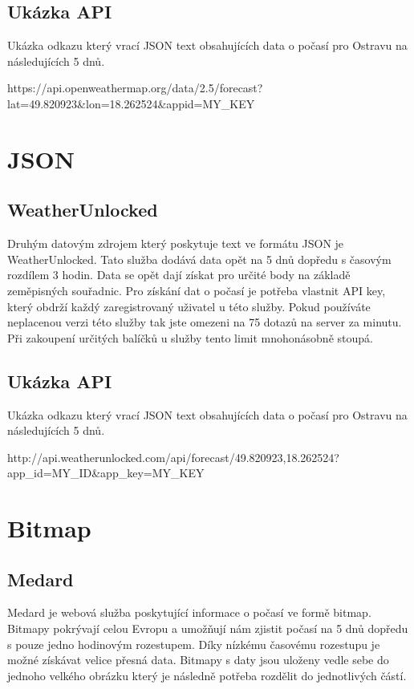\documentclass[czech,bachelor,dept460,male,csharp,cpdeclaration]{diploma}
\begin{document}
	\subsection{Ukázka API}
	
	Ukázka odkazu který vrací JSON text obsahujících data o počasí pro Ostravu na následujících 5 dnů.
	
	https://api.openweathermap.org/data/2.5/forecast?lat=49.820923\&lon=18.262524\&appid=MY\_KEY
	
	\section{JSON}
	\subsection{WeatherUnlocked}
	
	Druhým datovým zdrojem který poskytuje text ve formátu JSON je WeatherUnlocked. Tato služba dodává data opět na 5 dnů dopředu s časovým rozdílem 3 hodin. Data se opět dají získat pro určité body na základě zeměpisných souřadnic. Pro získání dat o počasí je potřeba vlastnit API key, který obdrží každý zaregistrovaný uživatel u této služby. Pokud používáte neplacenou verzi této služby tak jste omezeni na 75 dotazů na server za minutu. Při zakoupení určitých balíčků u služby tento limit mnohonásobně stoupá.
	
	\subsection{Ukázka API}
	
	Ukázka odkazu který vrací JSON text obsahujících data o počasí pro Ostravu na následujících 5 dnů.
	
	http://api.weatherunlocked.com/api/forecast/49.820923,18.262524?app\_id=MY\_ID\&app\_key=MY\_KEY
	
	\section{Bitmap}
	\subsection{Medard}
	
	Medard je webová služba poskytující informace o počasí ve formě bitmap. Bitmapy pokrývají celou Evropu a umožňují nám zjistit počasí na 5 dnů dopředu s pouze jedno hodinovým rozestupem. Díky nízkému časovému rozestupu je možné získávat velice přesná data. Bitmapy s daty jsou uloženy vedle sebe do jednoho velkého obrázku který je následně potřeba rozdělit do jednotlivých částí.
	
\end{document}
